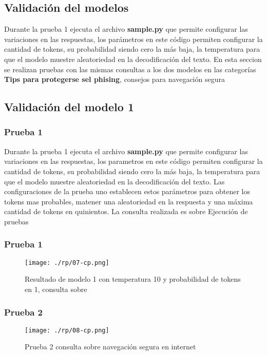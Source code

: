 \subsection{Validación del modelos}\label{section:Validación de prompt}
Durante la prueba 1 ejecuta el archivo \textbf{sample.py} que permite configurar las variaciones en las respuestas, los parámetros en este código permiten configurar la cantidad de tokens, su probabilidad siendo cero la más baja, la temperatura para que el modelo muestre aleatoriedad en la decodificación del texto. 
En esta seccion se realizan pruebas con las mismas consultas a los dos modelos en las categorías \textbf{Tips para protegerse sel phising}, {consejos para navegación segura}
\subsection{Validación del modelo 1}\label{section:Validación Modelo 2}
\subsubsection{ Prueba 1}\label{section:Prueba 1 config 2}
Durante la prueba 1 ejecuta el archivo \textbf{sample.py} que permite configurar las variaciones en las respuestas, los parametros en este código permiten configurar la cantidad de tokens, su probabilidad siendo cero la más baja, la temperatura para que el modelo muestre aleatoriedad en la decodificación del texto. Las configuraciones de la prueba uno establecen estos parámetros para obtener los tokens mas probables, matener una aleatoriedad en la respuesta y una máxima cantidad de tokens en quinientos.  
La consulta realizada es sobre 
Ejecución de pruebas
\subsubsection{ Prueba 1}\label{section:Modelo 1 Prueba1}
\begin{figure}[H]
	\centering %
	\texttt{[image: ./rp/07-cp.png]} 
	\caption{Resultado de modelo 1 con temperatura 10 y probabilidad de tokens en 1, consulta sobre\cite{}}
	\label{figure:Result prueba 1 mol 1}  %
\end{figure}
\subsubsection{ Prueba 2}\label{section:Modelo 1 Prueba2}
\begin{figure}[H]
	\centering %
	\texttt{[image: ./rp/08-cp.png]} 
	\caption{Prueba 2 consulta sobre navegación segura en internet}
	\label{figure:Result modelo 1 prueba 2}  %
\end{figure}
